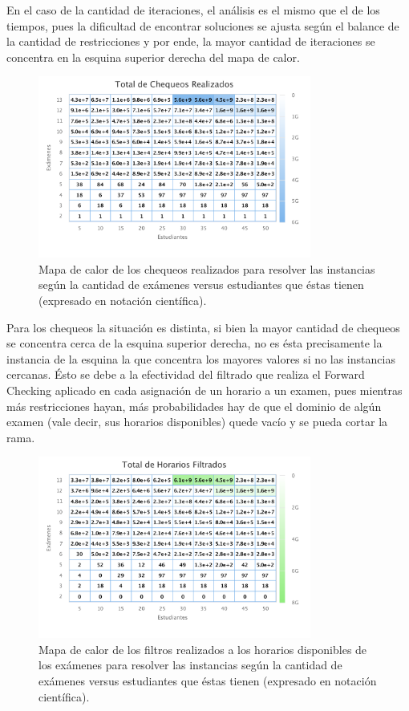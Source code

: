 \documentclass[letter, 10pt]{article}
\begin{document}
En el caso de la cantidad de iteraciones, el análisis es el mismo que el de los tiempos, pues la dificultad de encontrar soluciones se ajusta según el balance de la cantidad de restricciones y por ende, la mayor cantidad de iteraciones se concentra en la esquina superior derecha del mapa de calor. 

\begin{figure}[H]
\begin{center}
\includegraphics[width=0.8\textwidth]{img/g3.pdf}
\end{center}
\caption{Mapa de calor de los chequeos realizados para resolver las instancias según la cantidad de exámenes versus estudiantes que éstas tienen (expresado en notación científica).}
\label{fig:g3}
\end{figure}

Para los chequeos la situación es distinta, si bien la mayor cantidad de chequeos se concentra cerca de la esquina superior derecha, no es ésta precisamente la instancia de la esquina la que concentra los mayores valores si no las instancias cercanas. Ésto se debe a la efectividad del filtrado que realiza el Forward Checking aplicado en cada asignación de un horario a un examen, pues mientras más restricciones hayan, más probabilidades hay de que el dominio de algún examen (vale decir, sus horarios disponibles) quede vacío y se pueda cortar la rama.

\begin{figure}[H]
\begin{center}
\includegraphics[width=0.8\textwidth]{img/g4.pdf}
\end{center}
\caption{Mapa de calor de los filtros realizados a los horarios disponibles de los exámenes para resolver las instancias según la cantidad de exámenes versus estudiantes que éstas tienen (expresado en notación científica).}
\label{fig:g4}
\end{figure}
\end{document}
